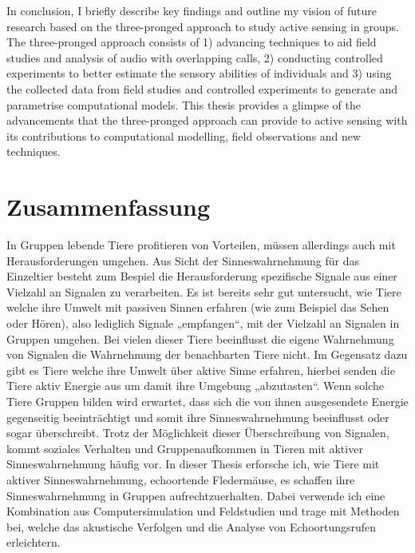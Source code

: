 \documentclass[
]{book}
\begin{document}
In conclusion, I briefly describe key findings and outline my vision of future research based on the three-pronged approach to study active sensing in groups. The three-pronged approach consists of 1) advancing techniques to aid field studies and analysis of audio with overlapping calls, 2) conducting controlled experiments to better estimate the sensory abilities of individuals and 3) using the collected data from field studies and controlled experiments to generate and parametrise computational models. This thesis provides a glimpse of the advancements that the three-pronged approach can provide to active sensing with its contributions to computational modelling, field observations and new techniques.

\newpage

\hypertarget{zusammenf}{%
\chapter*{Zusammenfassung}\label{zusammenf}}

In Gruppen lebende Tiere profitieren von Vorteilen, müssen allerdings auch mit Herausforderungen umgehen. Aus Sicht der Sinneswahrnehmung für das Einzeltier besteht zum Bespiel die Herausforderung spezifische Signale aus einer Vielzahl an Signalen zu verarbeiten. Es ist bereits sehr gut untersucht, wie Tiere welche ihre Umwelt mit passiven Sinnen erfahren (wie zum Beispiel das Sehen oder Hören), also lediglich Signale „empfangen``, mit der Vielzahl an Signalen in Gruppen umgehen. Bei vielen dieser Tiere beeinflusst die eigene Wahrnehmung von Signalen die Wahrnehmung der benachbarten Tiere nicht. Im Gegensatz dazu gibt es Tiere welche ihre Umwelt über aktive Sinne erfahren, hierbei senden die Tiere aktiv Energie aus um damit ihre Umgebung „abzutasten``. Wenn solche Tiere Gruppen bilden wird erwartet, dass sich die von ihnen ausgesendete Energie gegenseitig beeinträchtigt und somit ihre Sinneswahrnehmung beeinflusst oder sogar überschreibt. Trotz der Möglichkeit dieser Überschreibung von Signalen, kommt soziales Verhalten und Gruppenaufkommen in Tieren mit aktiver Sinneswahrnehmung häufig vor. In dieser Thesis erforsche ich, wie Tiere mit aktiver Sinneswahrnehmung, echoortende Fledermäuse, es schaffen ihre Sinneswahrnehmung in Gruppen aufrechtzuerhalten. Dabei verwende ich eine Kombination aus Computersimulation und Feldstudien und trage mit Methoden bei, welche das akustische Verfolgen und die Analyse von Echoortungsrufen erleichtern.
\end{document}
